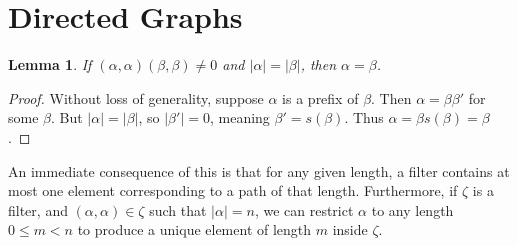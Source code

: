 \documentclass{article}
\newtheorem{lemma}[theorem]{Lemma}
\theoremstyle{definition}
\begin{document}
\section{Directed Graphs}

\begin{lemma} If $(\alpha, \alpha)(\beta, \beta) \neq 0$ and $|\alpha| = |\beta|$, then $\alpha = \beta$. \end{lemma}
\begin{proof}
    Without loss of generality, suppose $\alpha$ is a prefix of $\beta$. Then $\alpha = \beta \beta'$ for some $\beta$. But
    $|\alpha| = |\beta|$, so $|\beta'| = 0$, meaning $\beta' = s(\beta)$. Thus $\alpha = \beta s(\beta) = \beta$.
\end{proof}
An immediate consequence of this is that for any given length, a filter contains at most one element corresponding
to a path of that length. Furthermore, if $\zeta$ is a filter, and $(\alpha, \alpha) \in \zeta$ such that $|\alpha| = n$,
we can restrict $\alpha$ to any length $0 \leq m < n$ to produce a unique element of length $m$ inside $\zeta$.
\end{document}
